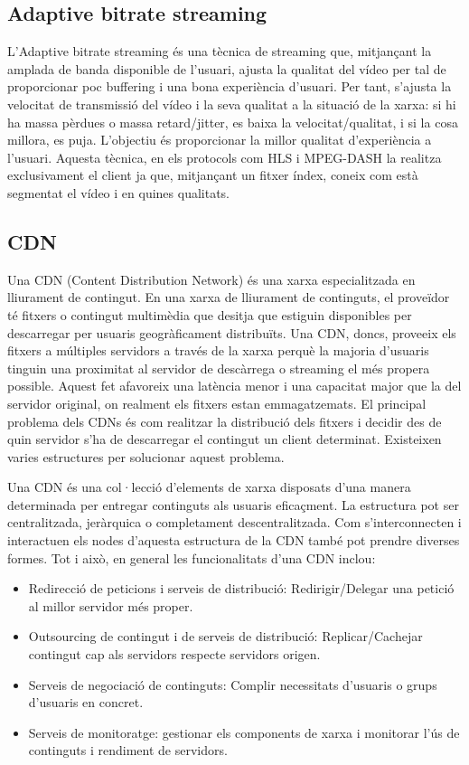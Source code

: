 \documentclass[12pt, titlepage]{article}
\begin{document}
\subsection{Adaptive bitrate streaming}
L'Adaptive bitrate streaming és una tècnica de streaming que, mitjançant la amplada de
banda disponible de l'usuari, ajusta la qualitat del vídeo per tal de proporcionar
poc buffering i una bona experiència d'usuari. Per tant,  s'ajusta la
velocitat de transmissió del vídeo i  la seva qualitat a la situació
de la xarxa: si hi ha massa pèrdues o massa retard/jitter, es baixa la velocitat/qualitat,
i si la cosa millora, es puja. L'objectiu és proporcionar la millor qualitat
d'experiència a l'usuari. Aquesta tècnica, en els protocols com HLS i MPEG-DASH la
realitza exclusivament el client ja que, mitjançant un fitxer índex, coneix com
està segmentat el vídeo i en quines qualitats.

\subsection{CDN}
Una CDN (Content Distribution Network) és una xarxa especialitzada en lliurament de contingut.
En una xarxa de lliurament de continguts, el proveïdor té fitxers o contingut
multimèdia que desitja que estiguin disponibles per descarregar per usuaris
geogràficament distribuïts. Una CDN, doncs, proveeix els fitxers a múltiples
servidors a través de la xarxa perquè la majoria d’usuaris tinguin una proximitat
al servidor de descàrrega o streaming el més propera possible.
Aquest fet afavoreix una latència menor i una capacitat major que la del servidor
original, on realment els fitxers estan emmagatzemats. El principal problema dels
CDNs és com realitzar la distribució dels fitxers i decidir des de quin servidor
s’ha de descarregar el contingut un client determinat. Existeixen varies estructures
per solucionar aquest problema.

Una CDN és una col·lecció d’elements de xarxa disposats d’una manera determinada
per entregar continguts als usuaris eficaçment. La estructura pot ser centralitzada,
jeràrquica o completament descentralitzada. Com s’interconnecten i interactuen els
nodes d’aquesta estructura de la CDN també pot prendre diverses formes. Tot i això,
en general les funcionalitats d’una CDN inclou:
\begin{itemize}
\item Redirecció de peticions i serveis de distribució: Redirigir/Delegar una petició al millor servidor més proper.
\item Outsourcing de contingut i de serveis de distribució: Replicar/Cachejar contingut cap als servidors respecte servidors origen.
\item Serveis de negociació de continguts: Complir necessitats d’usuaris o grups d’usuaris en concret.
\item Serveis de monitoratge: gestionar els components de xarxa i monitorar l’ús de continguts i rendiment de servidors.
\end{itemize}
\end{document}

